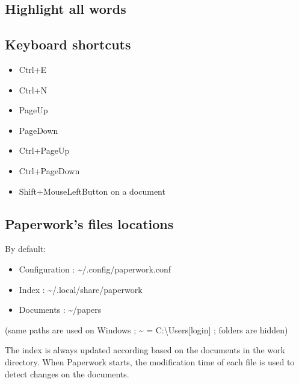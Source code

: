 \documentclass[10pt,a4paper]{article}
\begin{document}


\subsection{Highlight all words}



\subsection{Keyboard shortcuts}
\begin{itemize}
\item Ctrl+E
\item Ctrl+N
\item PageUp
\item PageDown
\item Ctrl+PageUp
\item Ctrl+PageDown
\item Shift+MouseLeftButton on a document
\end{itemize}

\subsection{Paperwork's files locations}

By default:
\begin{itemize}
\item Configuration : \textasciitilde /.config/paperwork.conf
\item Index : \textasciitilde /.local/share/paperwork
\item Documents : \textasciitilde /papers
\end{itemize}
(same paths are used on Windows ; \textasciitilde{} = C:\textbackslash Users{[}login{]}
; folders are hidden)

The index is always updated according based on the documents in the
work directory. When Paperwork starts, the modification time of each
file is used to detect changes on the documents.
\end{document}
